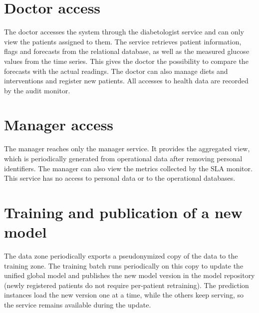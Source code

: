 \section{Doctor access}

The doctor accesses the system through the diabetologist service and can only view the patients assigned to them. The service retrieves patient information, flags and forecasts from the relational database, as well as the measured glucose values from the time series. This gives the doctor the possibility to compare the forecasts with the actual readings. The doctor can also manage diets and interventions and register new patients. All accesses to health data are recorded by the audit monitor.

\section{Manager access}

The manager reaches only the manager service. It provides the aggregated view, which is periodically generated from operational data after removing personal identifiers. The manager can also view the metrics collected by the SLA monitor. This service has no access to personal data or to the operational databases.

\section{Training and publication of a new model}

The data zone periodically exports a pseudonymized copy of the data to the
training zone. The training batch runs periodically on this copy to update
the unified global model and publishes the new model version in the model
repository (newly registered patients do not require per-patient retraining).
The prediction instances load the new version one at a time, while the others
keep serving, so the service remains available during the update.